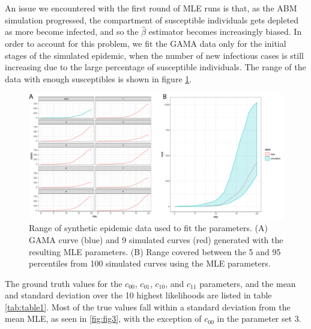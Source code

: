 \documentclass{article}
\begin{document}
An issue we encountered with the first round of MLE runs is that, as the ABM simulation progressed, the compartment of susceptible individuals gets depleted as more become infected, and so the $\hat{\beta}$ estimator becomes increasingly biased. In order to account for this problem, we fit the GAMA data only for the initial stages of the simulated epidemic, when the number of new infectious cases is still increasing due to the large percentage of susceptible individuals. The range of the data with enough susceptibles is shown in figure \ref{fig:fig2}.

\begin{figure} %
  \centering
  \includegraphics[scale=0.4]{Figure-2.pdf}
  \caption{Range of synthetic epidemic data used to fit the parameters. (A) GAMA curve (blue) and 9 simulated curves (red) generated with the resulting MLE parameters. (B) Range covered between the 5 and 95 percentiles from 100 simulated curves using the MLE parameters. }
  \label{fig:fig2}
\end{figure}

The ground truth values for the $c_{00}$, $c_{01}$, $c_{10}$, and $c_{11}$ parameters, and the mean and standard deviation over the 10 highest likelihoods are listed in table \ref{tab:table1}. Most of the true values fall within a standard deviation from the mean MLE, as seen in \ref{fig:fig3}, with the exception of $c_{00}$ in the parameter set 3.
\end{document}
